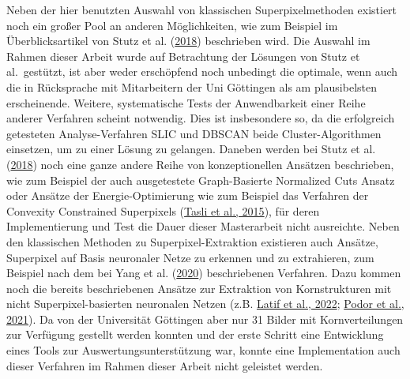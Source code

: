 \documentclass[
  12pt,
  openany]{book}
\begin{document}
Neben der hier benutzten Auswahl von klassischen Superpixelmethoden existiert noch ein großer Pool an anderen Möglichkeiten, wie zum Beispiel im Überblicksartikel von Stutz et al. (\protect\hyperlink{ref-stutzSuperpixelsEvaluationStateoftheart2018}{2018}) beschrieben wird. Die Auswahl im Rahmen dieser Arbeit wurde auf Betrachtung der Lösungen von Stutz et al.~gestützt, ist aber weder erschöpfend noch unbedingt die optimale, wenn auch die in Rücksprache mit Mitarbeitern der Uni Göttingen als am plausibelsten erscheinende. Weitere, systematische Tests der Anwendbarkeit einer Reihe anderer Verfahren scheint notwendig. Dies ist insbesondere so, da die erfolgreich getesteten Analyse-Verfahren SLIC und DBSCAN beide Cluster-Algorithmen einsetzen, um zu einer Lösung zu gelangen. Daneben werden bei Stutz et al. (\protect\hyperlink{ref-stutzSuperpixelsEvaluationStateoftheart2018}{2018}) noch eine ganze andere Reihe von konzeptionellen Ansätzen beschrieben, wie zum Beispiel der auch ausgetestete Graph-Basierte Normalized Cuts Ansatz oder Ansätze der Energie-Optimierung wie zum Beispiel das Verfahren der Convexity Constrained Superpixels (\protect\hyperlink{ref-tasliConvexityConstrainedEfficient2015}{Tasli et al., 2015}), für deren Implementierung und Test die Dauer dieser Masterarbeit nicht ausreichte.
Neben den klassischen Methoden zu Superpixel-Extraktion existieren auch Ansätze, Superpixel auf Basis neuronaler Netze zu erkennen und zu extrahieren, zum Beispiel nach dem bei Yang et al. (\protect\hyperlink{ref-yangSuperpixelSegmentationFully2020}{2020}) beschriebenen Verfahren. Dazu kommen noch die bereits beschriebenen Ansätze zur Extraktion von Kornstrukturen mit nicht Superpixel-basierten neuronalen Netzen (z.B. \protect\hyperlink{ref-latifDeepLearningBasedAutomaticMineral2022}{Latif et al., 2022}; \protect\hyperlink{ref-podorSEraMicSemiautomaticMethod2021}{Podor et al., 2021}). Da von der Universität Göttingen aber nur 31 Bilder mit Kornverteilungen zur Verfügung gestellt werden konnten und der erste Schritt eine Entwicklung eines Tools zur Auswertungsunterstützung war, konnte eine Implementation auch dieser Verfahren im Rahmen dieser Arbeit nicht geleistet werden. \newline
\end{document}

